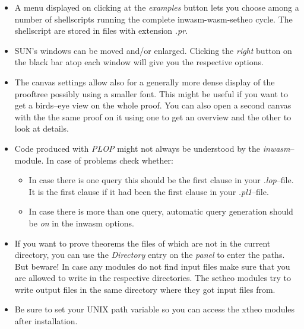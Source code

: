 \begin{itemize}
\item A menu displayed on clicking at the {\it examples\/} button lets you choose among a number of
shellscripts running the complete inwasm-wasm-setheo cycle. The shellscript are stored in files with
extension {\it .pr\/}. 
\item SUN's windows can be moved and/or enlarged. Clicking the {\it right\/} button on the black bar atop
each window will give you the respective options.
\item The canvas settings allow also for a generally more dense display of the prooftree possibly using a
smaller font. This might be useful if you want to get a birds--eye view on the whole proof.
You can also open a second canvas with the the same proof on it using one to get an overview and
the other to look at details.
\item Code produced with {\it PLOP\/} might not always be understood by the {\it inwasm\/}--module. In case of problems
check whether:
\begin{itemize}
\item In case there is one query this should be the first clause in your {\it .lop\/}--file. It is the first
clause if it had been the first clause in your {\it .pl1\/}--file.
\item In case there is more than one query, automatic query generation should be {\it on\/} in the
inwasm options.
\end{itemize}
\item If you want to prove theorems the files of which are not in the current directory,
you can use the {\it Directory\/} entry on the {\it panel\/} to enter the paths.
But beware!
In case any modules do not find input files make sure that you are allowed to write in the
respective directories. The setheo modules try to write output files in the same directory where
they got input files from. 
\item Be sure to set your UNIX path variable so you can access the xtheo modules after installation.
\end{itemize}
